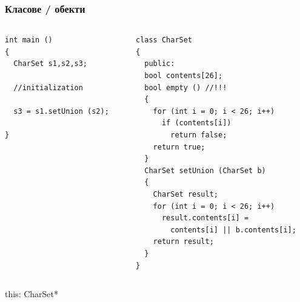 \documentclass{beamer}
\begin{document}
\begin{frame}[fragile]
\frametitle{Класове / обекти}


\begin{columns}[t]
  \begin{column}{0.5\textwidth}
\begin{flushleft}
\begin{lstlisting}
int main ()
{
  CharSet s1,s2,s3;

  //initialization

  s3 = s1.setUnion (s2);

}
\end{lstlisting}  
\end{flushleft}
  \end{column}
  \begin{column}{0.5\textwidth}
\begin{flushleft}
\begin{lstlisting}
class CharSet
{
  public:
  bool contents[26];
  bool empty () //!!!
  {
    for (int i = 0; i < 26; i++)
      if (contents[i])
        return false;
    return true;
  }
  CharSet setUnion (CharSet b)
  {
    CharSet result;
    for (int i = 0; i < 26; i++)
      result.contents[i] = 
        contents[i] || b.contents[i];
    return result;
  }
}
\end{lstlisting}  
\end{flushleft}

  \end{column}
\end{columns}


\end{frame}


\begin{frame}
\centerline{this: CharSet*}
\end{frame}
\end{document}
